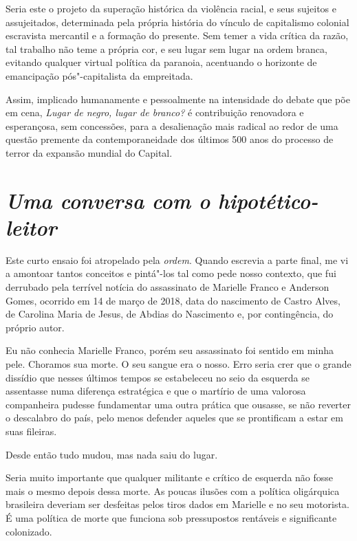Seria este o projeto da superação histórica da violência racial, e seus
sujeitos e assujeitados, determinada pela própria história do vínculo de
capitalismo colonial escravista mercantil e a formação do presente. Sem
temer a vida crítica da razão, tal trabalho não teme a própria cor, e
seu lugar sem lugar na ordem branca, evitando qualquer virtual política
da paranoia, acentuando o horizonte de emancipação pós"-capitalista da
empreitada.

Assim, implicado humanamente e pessoalmente na intensidade do debate que
põe em cena, \emph{Lugar de negro, lugar de branco?} é contribuição
renovadora e esperançosa, sem concessões, para a desalienação mais
radical ao redor de uma questão premente da contemporaneidade dos
últimos 500 anos do processo de terror da expansão mundial do Capital.

\chapter{\emph{Uma conversa com o hipotético-leitor}}

Este curto ensaio foi atropelado pela \emph{ordem}. Quando escrevia a
parte final, me vi a amontoar tantos conceitos e pintá"-los tal como pede
nosso contexto, que fui derrubado pela terrível notícia do assassinato
de Marielle Franco e Anderson Gomes, ocorrido em 14 de março de 2018,
data do nascimento de Castro Alves, de Carolina Maria de Jesus, de
Abdias do Nascimento e, por contingência, do próprio autor.

Eu não conhecia Marielle Franco, porém seu assassinato foi sentido em
minha pele. Choramos sua morte. O seu sangue era o nosso. Erro seria
crer que o grande dissídio que nesses últimos tempos se estabeleceu no
seio da esquerda se assentasse numa diferença estratégica e que o
martírio de uma valorosa companheira pudesse fundamentar uma outra
prática que ousasse, se não reverter o descalabro do país, pelo menos
defender aqueles que se prontificam a estar em suas fileiras.

Desde então tudo mudou, mas nada saiu do lugar.

Seria muito importante que qualquer militante e crítico de esquerda não
fosse mais o mesmo depois dessa morte. As poucas ilusões com a política
oligárquica brasileira deveriam ser desfeitas pelos tiros dados em
Marielle e no seu motorista. É uma política de morte que funciona sob
pressupostos rentáveis e significante colonizado.

